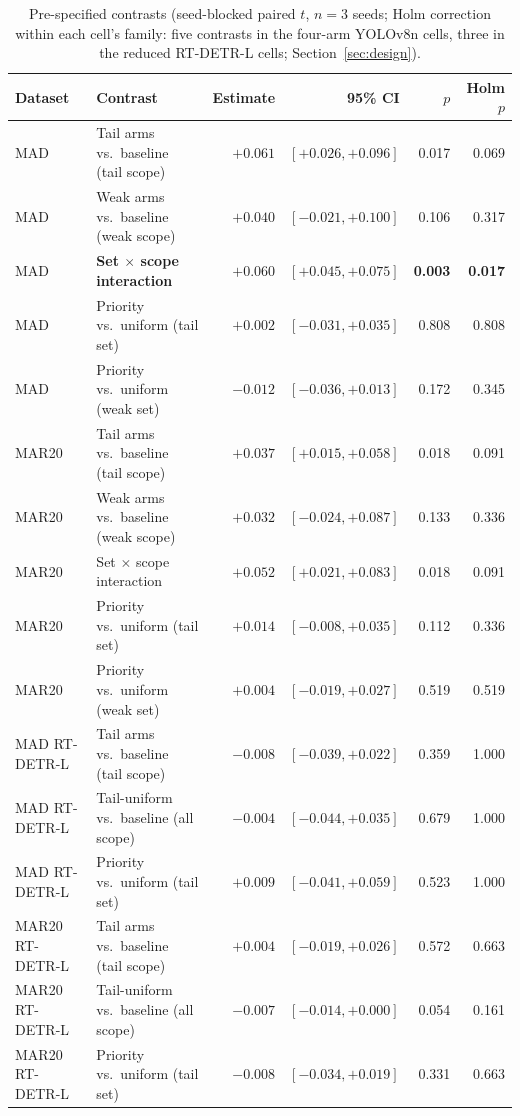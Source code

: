 \documentclass[preprint,12pt,authoryear]{elsarticle}
\begin{document}
\begin{table}[t]
\centering
\caption{Pre-specified contrasts (seed-blocked paired $t$, $n = 3$ seeds; Holm
correction within each cell's family: five contrasts in the four-arm
YOLOv8n cells, three in the reduced RT-DETR-L cells;
Section~\ref{sec:design}).}
\label{tab:contrasts}
\small
\begin{tabular}{llrrrr}
\toprule
Dataset & Contrast & Estimate & 95\% CI & $p$ & Holm $p$ \\
\midrule
MAD & Tail arms vs.\ baseline (tail scope)  & $+0.061$ & $[+0.026, +0.096]$ & 0.017 & 0.069 \\
MAD & Weak arms vs.\ baseline (weak scope)  & $+0.040$ & $[-0.021, +0.100]$ & 0.106 & 0.317 \\
MAD & \textbf{Set $\times$ scope interaction} & $\mathbf{+0.060}$ & $\mathbf{[+0.045, +0.075]}$ & \textbf{0.003} & \textbf{0.017} \\
MAD & Priority vs.\ uniform (tail set)    & $+0.002$ & $[-0.031, +0.035]$ & 0.808 & 0.808 \\
MAD & Priority vs.\ uniform (weak set)    & $-0.012$ & $[-0.036, +0.013]$ & 0.172 & 0.345 \\
\midrule
MAR20 & Tail arms vs.\ baseline (tail scope)  & $+0.037$ & $[+0.015, +0.058]$ & 0.018 & 0.091 \\
MAR20 & Weak arms vs.\ baseline (weak scope)  & $+0.032$ & $[-0.024, +0.087]$ & 0.133 & 0.336 \\
MAR20 & Set $\times$ scope interaction & $+0.052$ & $[+0.021, +0.083]$ & 0.018 & 0.091 \\
MAR20 & Priority vs.\ uniform (tail set)    & $+0.014$ & $[-0.008, +0.035]$ & 0.112 & 0.336 \\
MAR20 & Priority vs.\ uniform (weak set)    & $+0.004$ & $[-0.019, +0.027]$ & 0.519 & 0.519 \\
\midrule
MAD RT-DETR-L & Tail arms vs.\ baseline (tail scope) & $-0.008$ & $[-0.039, +0.022]$ & 0.359 & 1.000 \\
MAD RT-DETR-L & Tail-uniform vs.\ baseline (all scope) & $-0.004$ & $[-0.044, +0.035]$ & 0.679 & 1.000 \\
MAD RT-DETR-L & Priority vs.\ uniform (tail set) & $+0.009$ & $[-0.041, +0.059]$ & 0.523 & 1.000 \\
\midrule
MAR20 RT-DETR-L & Tail arms vs.\ baseline (tail scope) & $+0.004$ & $[-0.019, +0.026]$ & 0.572 & 0.663 \\
MAR20 RT-DETR-L & Tail-uniform vs.\ baseline (all scope) & $-0.007$ & $[-0.014, +0.000]$ & 0.054 & 0.161 \\
MAR20 RT-DETR-L & Priority vs.\ uniform (tail set) & $-0.008$ & $[-0.034, +0.019]$ & 0.331 & 0.663 \\
\bottomrule
\end{tabular}
\end{table}
\end{document}
